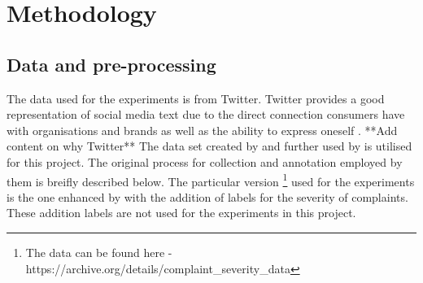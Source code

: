 \chapter{Methodology}

\section{Data and pre-processing}
The data used for the experiments is from Twitter. Twitter provides a good representation of social media text due to the direct connection consumers have with organisations and brands as well as the ability to express oneself \cite{preotiuc-pietro_automatically_2019}. **Add content on why Twitter**
\newline \newline
The data set created by \cite{preotiuc-pietro_automatically_2019} and further used by \cite{jin_complaint_2020} is utilised for this project. The original process for collection and annotation employed by them is breifly described below. The particular version \footnote{The data can be found here - https://archive.org/details/complaint\_severity\_data} used for the experiments is the one enhanced by \cite{jinModelingSeverityComplaints2021} with the addition of labels for the severity of complaints. These addition labels are not used for the experiments in this project.
